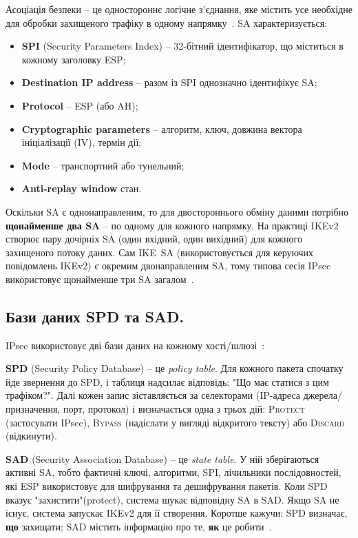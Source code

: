 Асоціація безпеки -- це одностороннє логічне з’єднання, яке містить усе необхідне для обробки захищеного трафіку 
в одному напрямку~\cite{rfc4301}. SA характеризується:
\begin{itemize}
    \item \textbf{SPI} (Security Parameters Index) -- 32-бітний ідентифікатор, що міститься в кожному заголовку 
        ESP;
    \item \textbf{Destination IP address} -- разом із SPI однозначно ідентифікує SA;
    \item \textbf{Protocol} -- ESP (або AH);
    \item \textbf{Cryptographic parameters} -- алгоритм, ключ, довжина вектора ініціалізації (IV), термін дії;
    \item \textbf{Mode} -- транспортний або тунельний;
    \item \textbf{Anti-replay window} стан.
\end{itemize}

Оскільки SA є однонаправленим, то для двостороннього обміну даними потрібно \textbf{щонайменше два SA} -- по одному 
для кожного напрямку. На практиці IKEv2 створює пару дочірніх SA (один вхідний, один вихідний) для кожного захищеного 
потоку даних. Сам IKE~SA (використовується для керуючих повідомлень IKEv2) є окремим двонаправленим SA, тому типова 
сесія IPsec використовує щонайменше три SA загалом~\cite{rfc7296}.

\subsection*{Бази даних SPD та SAD.}

IPsec використовує дві бази даних на кожному хості/шлюзі~\cite{rfc4301}:

\textbf{SPD} (Security Policy Database) -- це \textit{policy table}. Для кожного пакета спочатку йде звернення 
до SPD, і таблиця надсилає відповідь: "Що має статися з цим трафіком?"{}. Далі кожен запис зіставляється за 
селекторами (IP-адреса джерела/призначення, порт, протокол) і визначається одна з трьох дій: \textsc{Protect} 
(застосувати IPsec), \textsc{Bypass} (надіслати у вигляді відкритого тексту) або \textsc{Discard} (відкинути). 

\textbf{SAD} (Security Association Database) -- це \textit{state table}. У ній зберігаються активні SA, тобто 
фактичні ключі, алгоритми, SPI, лічильники послідовностей, які ESP використовує для шифрування та дешифрування 
пакетів. Коли SPD вказує "захистити"{}(protect), система шукає відповідну SA в SAD. Якщо SA не існує, система 
запускає IKEv2 для її створення. Коротше кажучи: SPD визначає, \textbf{що} захищати; SAD містить інформацію про 
те, \textbf{як} це робити~\cite{nist_sp800_77r1}.

